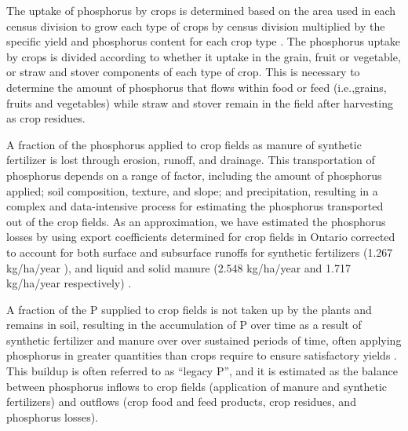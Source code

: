 \documentclass[authoryear]{elsarticle}
\begin{document}
The uptake of phosphorus by crops is determined based on the area used in each census division \citep{CensusDivisionOpendatasoft} to grow each type of crops by census division \citep{FieldCropsCensus,FieldVegetablesCensus,GreenhousesCensus} multiplied by the specific yield and phosphorus content for each crop type \citep{USDAHandbook}.  The phosphorus uptake by crops is divided according to whether it uptake in the grain, fruit or vegetable, or straw and stover components of each type of crop. This is necessary to determine the amount of phosphorus that flows within food or feed (i.e.,grains, fruits and vegetables) while straw and stover remain in the field after harvesting as crop residues.

A fraction of the phosphorus applied to crop fields as manure of synthetic fertilizer is lost through erosion, runoff, and drainage. This transportation of phosphorus depends on a range of factor, including the amount of phosphorus applied; soil composition, texture, and slope; and precipitation, resulting in a complex and data-intensive process for estimating the phosphorus transported out of the crop fields. As an approximation, we have estimated the phosphorus losses by using export coefficients determined for crop fields in Ontario corrected to account for both surface and subsurface runoffs for synthetic fertilizers (1.267 kg/ha/year ), and liquid and solid manure (2.548 kg/ha/year and 1.717 kg/ha/year respectively) \citep{zhang2015tile, wang2018solid,tan2011surface}.

A fraction of the P supplied to crop fields is not taken up by the plants and remains in soil, resulting in the accumulation of P over time as a result of synthetic fertilizer and manure over over sustained periods of time, often applying phosphorus in greater quantities than crops require to ensure satisfactory yields \citep{reid2019addressing}. This buildup is often referred to as “legacy P”, and it is estimated as the balance between phosphorus inflows to crop fields (application of manure and synthetic fertilizers) and outflows (crop food and feed products, crop residues, and phosphorus losses).
\end{document}
